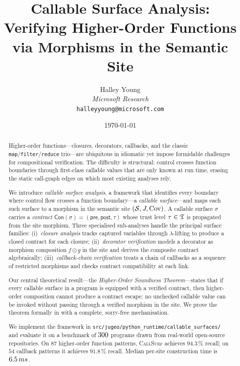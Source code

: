 \documentclass[11pt]{article}
\title{\textbf{Callable Surface Analysis:\\
       Verifying Higher-Order \Python{} Functions\\
       via Morphisms in the Semantic Site}}
\author{%
  Halley Young\\
  \textit{Microsoft Research}\\
  \texttt{halleyyoung@microsoft.com}
}
\date{\today}
\newcommand{\surf}{\sigma}                     %
\newcommand{\Contract}{\mathsf{Con}}           %
\newcommand{\Pre}{\mathsf{pre}}                %
\newcommand{\Post}{\mathsf{post}}              %
\newcommand{\compose}{\mathbin{\odot}}         %
\newcommand{\MapF}{\texttt{map}}               %
\newcommand{\FilterF}{\texttt{filter}}         %
\newcommand{\ReduceF}{\texttt{reduce}}         %
\newcommand{\CallSurf}{\textsc{CallSurf}}      %
\newcommand{\numhof}{87}                       %
\newcommand{\numcb}{54}                        %
\newcommand{\hofrecall}{94.3}                  %
\newcommand{\cbrecall}{91.8}                   %
\begin{document}
\maketitle

\begin{abstract}
Higher-order functions---closures, decorators, callbacks, and the
classic \MapF/\FilterF/\ReduceF{} trio---are ubiquitous in idiomatic
\Python{} yet impose formidable challenges for compositional
verification.  The difficulty is structural: control crosses function
boundaries through first-class callable values that are only known at
run time, erasing the static call-graph edges on which most existing
analyses rely.

We introduce \emph{callable surface analysis}, a framework that
identifies every boundary where control flow crosses a
function boundary---a \emph{callable surface}---and maps each
such surface to a morphism in the \JuGeo{} semantic site
$(\mathcal{S}, J, \mathrm{Cov})$.  A callable surface $\surf$ carries a
\emph{contract} $\Contract(\surf) = (\Pre, \Post, \tau)$ whose
trust level $\tau \in \mathfrak{T}$ is propagated from the site morphism.
Three specialised sub-analyses handle the principal surface
families: (i)~\emph{closure analysis} tracks captured variables
through $\lambda$-lifting to produce a closed contract for each
closure; (ii)~\emph{decorator verification} models a decorator as
morphism composition $f \compose g$ in the site and derives the
composite contract algebraically; (iii)~\emph{callback-chain
verification} treats a chain of callbacks as a sequence of
restricted morphisms and checks contract compatibility at each
link.

Our central theoretical result---the \emph{Higher-Order Soundness
Theorem}---states that if every callable surface in a
\Python{} program is equipped with a verified contract, then
higher-order composition cannot produce a contract escape: no
unchecked callable value can be invoked without passing through a
verified morphism in the site.  We prove the theorem formally in
\LEAN{} with a complete, sorry-free mechanisation.

We implement the framework in
\texttt{src/jugeo/python\_runtime/callable\_surfaces/} and evaluate
it on a benchmark of $300{}$ \Python{} programs drawn from
real-world open-source repositories.  On $\numhof{}$ higher-order
function patterns, \CallSurf{} achieves $\hofrecall{}\,\%$ recall;
on $\numcb{}$ callback patterns it achieves $\cbrecall{}\,\%$
recall.  Median per-site construction time is $6.5\,ms{}$.
\end{abstract}
\end{document}
